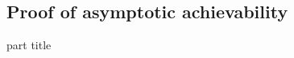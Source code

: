 






\subsection{Proof of asymptotic achievability}
\begin{frame}
 \vspace{8.0ex}
\begin{center}
\begin{beamercolorbox}[sep=12pt,center]{part title}
\insertsubsection\par
\end{beamercolorbox}
\end{center}
\end{frame}

